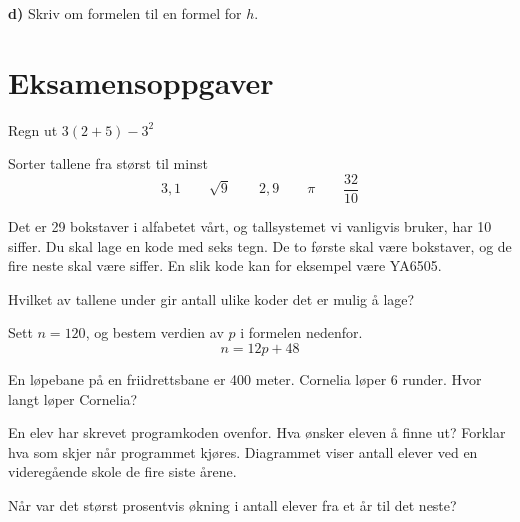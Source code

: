 \textbf{d)} Skriv om formelen til en formel for $ h $.
\newpage
\section{Eksamensoppgaver}
\st{
\eksbm
}

Regn ut $ 3(2+5)-3^2  $

Sorter tallene fra størst til minst
\[ 3,1\qquad\sqrt{9}\qquad2,9\qquad\pi \qquad \frac{32}{10} \]

Det er 29 bokstaver i alfabetet vårt, og tallsystemet vi vanligvis bruker, har 10 siffer.
Du skal lage en kode med seks tegn. De to første skal være bokstaver, og de fire neste skal være
siffer. En slik kode kan for eksempel være YA6505. \os

Hvilket av tallene under gir antall ulike koder det er mulig å lage? \os
{}

Sett $ n=120 $, og bestem verdien av $ p $ i formelen nedenfor. 
\[ n = 12p + 48 \]

En løpebane på en friidrettsbane er 400 meter.
Cornelia løper 6 runder. Hvor langt løper Cornelia? \os


En elev har skrevet programkoden ovenfor.
Hva ønsker eleven å finne ut?
Forklar hva som skjer når programmet kjøres.
\newpage
{}
Diagrammet viser antall elever ved en videregående skole de fire siste årene.\os

Når var det størst prosentvis økning i antall elever fra et år til det neste?
	




